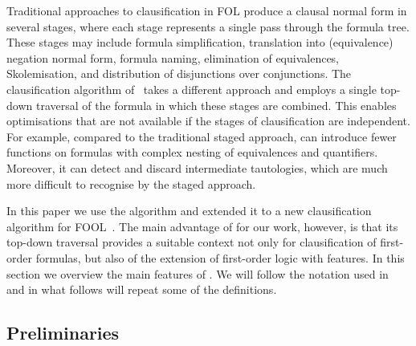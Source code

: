 
%
%

Traditional approaches to
clausification in FOL \cite{nonnengart2001computing,Vampire13} produce a clausal normal
form in several stages, where each stage
represents a single pass through the formula tree. These stages may include formula simplification, translation into (equivalence) negation normal form,
formula naming, elimination of equivalences, Skolemisation, and distribution of
disjunctions over conjunctions. The \newcnf{} clausification algorithm
of~\cite{newcnf_fol} takes a different approach and employs a single top-down
traversal of the formula in which these stages are combined.  
This enables optimisations that are not available if the stages of clausification are independent. For example, compared to the traditional staged approach, \newcnf{} can introduce fewer \Skolem{} functions on formulas with complex nesting of equivalences and quantifiers. Moreover, it can detect and discard intermediate tautologies, 
which are much more difficult to recognise by the staged approach.
%
%

In this paper we use the \newcnf{} algorithm and extended it to a new clausification algorithm for FOOL~\cite{FOOL}. 
The main advantage of \newcnf{} for our work, however, is that its top-down
traversal provides a suitable context not only for clausification of first-order
formulas, but also of the extension of first-order logic with \folb{}
features. In this section we overview the main features of \newcnf{}. We will follow the notation used in~\cite{newcnf_fol} and in what follows will repeat some of the definitions. 

\subsection{Preliminaries}

